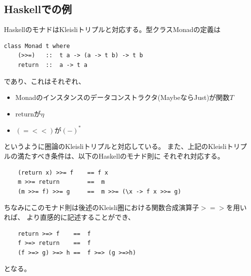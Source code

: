 \subsection{Haskellでの例}
HaskellのモナドはKleisliトリプルと対応する。型クラスMonadの定義は
\begin{lstlisting}
class Monad t where
    (>>=)   ::  t a -> (a -> t b) -> t b
    return  ::  a -> t a
\end{lstlisting}
であり、これはそれぞれ、
\begin{itemize}
    \item Monadのインスタンスのデータコンストラクタ(MaybeならJust)が関数$T$
    \item returnが$\eta$
    \item $(=<<)$が$(-)^*$
\end{itemize}
というように圏論のKleisliトリプルと対応している。
また、上記のKleisliトリプルの満たすべき条件は、以下のHaskellのモナド則に
それぞれ対応する。
\begin{lstlisting}
    (return x) >>= f    == f x
    m >>= return        ==  m
    (m >>= f) >>= g     ==  m >>= (\x -> f x >>= g)
\end{lstlisting}

ちなみにこのモナド則は後述のKleisli圏における関数合成演算子$>=>$を用いれば、
より直感的に記述することができ、
\begin{lstlisting}
    return >=> f    ==  f
    f >=> return    ==  f
    (f >=> g) >=> h ==  f >=> (g >=>h)
\end{lstlisting}
となる。
